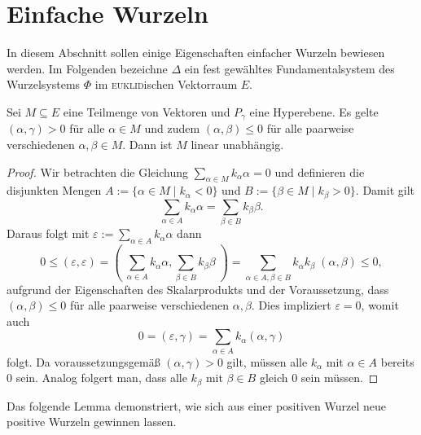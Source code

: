 \section{Einfache Wurzeln}

In diesem Abschnitt sollen einige Eigenschaften einfacher Wurzeln bewiesen werden.  
Im Folgenden bezeichne $\Delta$ ein fest gewähltes Fundamentalsystem des Wurzelsystems $\Phi$ im \textsc{euklid}ischen Vektorraum $E$.

\begin{lem}
  \label{lem:independentSet}
  Sei $M \subseteq E$ eine Teilmenge von Vektoren und $P_\gamma$ eine Hyperebene.
  Es gelte $(\alpha, \gamma) > 0$ für alle $\alpha \in M$ und zudem $(\alpha, \beta) \leq 0$ für alle paarweise verschiedenen $\alpha, \beta \in M$.
  Dann ist $M$ linear unabhängig.
\end{lem}

\begin{proof}
  Wir betrachten die Gleichung $\sum_{\alpha \in M} k_\alpha \alpha = 0$ und definieren die disjunkten Mengen $A := \{\alpha \in M \mid k_\alpha < 0\}$ und  $B := \{\beta \in M \mid k_\beta > 0\}$. 
  Damit gilt 
  \begin{displaymath}
    \sum_{\alpha \in A} k_\alpha \alpha = \sum_{\beta \in B} k_\beta \beta.
  \end{displaymath}
  Daraus folgt mit $\varepsilon := \sum_{\alpha \in A} k_\alpha \alpha$ dann
  \begin{displaymath}
    0 
    \leq (\varepsilon, \varepsilon) 
    = (\;\sum_{\alpha \in A} k_\alpha \alpha,\sum_{\beta \in B} k_\beta \beta\;) 
    = \sum_{\alpha \in A, \beta \in B} k_\alpha k_\beta \; (\alpha, \beta) 
    \leq 0,
  \end{displaymath}
  aufgrund der Eigenschaften des Skalarprodukts und der Voraussetzung, dass $(\alpha, \beta) \leq 0$ für alle paarweise verschiedenen $\alpha, \beta$.
  Dies impliziert $\varepsilon = 0$, womit auch 
  \begin{displaymath}
    0 = (\varepsilon, \gamma) = \sum_{\alpha \in A} k_\alpha (\alpha, \gamma)
  \end{displaymath}
  folgt. Da voraussetzungsgemäß $(\alpha, \gamma) > 0$ gilt, müssen alle $k_\alpha$ mit $\alpha \in A$ bereits $0$ sein.
  Analog folgert man, dass alle $k_\beta$ mit $\beta \in B$ gleich $0$ sein müssen.
\end{proof}

Das folgende Lemma demonstriert, wie sich aus einer positiven Wurzel neue positive Wurzeln gewinnen lassen.

